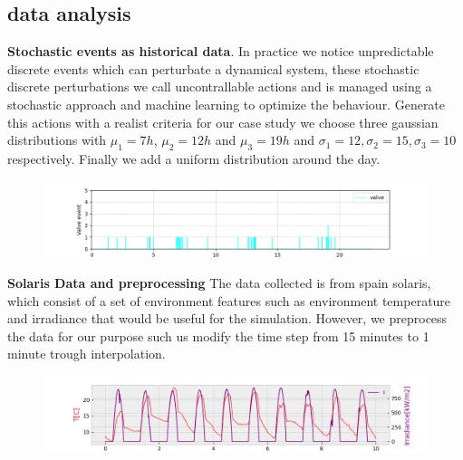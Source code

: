     \subsection{data analysis}
      \textbf{Stochastic events as historical data}. In practice
      we notice unpredictable discrete events which can perturbate a dynamical 
      system, these stochastic discrete perturbations we call uncontrallable actions and 
      is managed using a stochastic approach and machine learning to optimize
      the behaviour. Generate this actions with a realist criteria for our case study 
      we choose three gaussian distributions with $\mu_1 = 7h$, $\mu_2 = 12h$ and $\mu_3 = 19h$
      and $\sigma_1=12,\sigma_2=15, \sigma_3=10$ respectively. Finally we add 
      a uniform distribution around the day.
      \begin{figure}[!hbt]      
        \includegraphics[width=1.2\linewidth]{images/uncontrollable}      
        \label{fig:uncontrollable}
      \end{figure}

      \clearpage

      \textbf{Solaris Data and preprocessing} The data collected is from 
      spain solaris, which consist of a set of environment features such as
      environment temperature and irradiance that would be useful for the 
      simulation. However, we preprocess the data for our purpose such us
      modify the time step from 15 minutes to 1 minute trough interpolation.
      \begin{figure}[!hbt]
        \includegraphics[width=1.2\linewidth]{images/solaris2}
      \end{figure}
      
